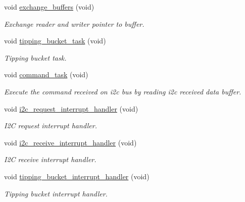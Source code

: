 \begin{DoxyCompactItemize}
void \hyperlink{i2c-rain_8h_aafa3d59a1bde3085849eee08f110612f}{exchange\+\_\+buffers} (void)
\begin{DoxyCompactList}\small\item\em Exchange reader and writer pointer to buffer. \end{DoxyCompactList}\item 
void \hyperlink{i2c-rain_8h_a8fcd3e091d63c9caff82b8bc3398c279}{tipping\+\_\+bucket\+\_\+task} (void)
\begin{DoxyCompactList}\small\item\em Tipping bucket task. \end{DoxyCompactList}\item 
void \hyperlink{i2c-rain_8h_a9f32a4169471a435e9364460d7b1761d}{command\+\_\+task} (void)
\begin{DoxyCompactList}\small\item\em Execute the command received on i2c bus by reading i2c received data buffer. \end{DoxyCompactList}\item 
void \hyperlink{i2c-rain_8h_ac1da31566bf05976ecb87372278a1ea8}{i2c\+\_\+request\+\_\+interrupt\+\_\+handler} (void)
\begin{DoxyCompactList}\small\item\em I2C request interrupt handler. \end{DoxyCompactList}\item 
void \hyperlink{i2c-rain_8h_a7f81fcf39717baf18f2e7c2eee2051ae}{i2c\+\_\+receive\+\_\+interrupt\+\_\+handler} (void)
\begin{DoxyCompactList}\small\item\em I2C receive interrupt handler. \end{DoxyCompactList}\item 
void \hyperlink{i2c-rain_8h_a7fcfeb4fd75663ddccc79030c37d68b9}{tipping\+\_\+bucket\+\_\+interrupt\+\_\+handler} (void)
\begin{DoxyCompactList}\small\item\em Tipping bucket interrupt handler. \end{DoxyCompactList}\end{DoxyCompactItemize}
